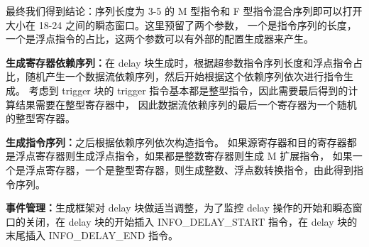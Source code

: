 \begin{table}[h!]
    \begin{center} 
    \caption{整数指令组合} 
    \label{table:int-seq}  
    \end{center}
\end{table}

最终我们得到结论：序列长度为 3-5 的 M 型指令和 F 型指令混合序列即可以打开大小在 18-24 之间的瞬态窗口。这里预留了两个参数，
一个是指令序列的长度，一个是浮点指令的占比，这两个参数可以有外部的配置生成器来产生。\par

\textbf{生成寄存器依赖序列：}在 delay 块生成时，根据超参数指令序列长度和浮点指令占比，随机产生一个数据流依赖序列，然后开始根据这个依赖序列依次进行指令生成。
考虑到 trigger 块的 trigger 指令基本都是整型指令，因此需要最后得到的计算结果需要在整型寄存器中，
因此数据流依赖序列的最后一个寄存器为一个随机的整型寄存器。\par

\textbf{生成指令序列：}之后根据依赖序列依次构造指令。
如果源寄存器和目的寄存器都是浮点寄存器则生成浮点指令，如果都是整数寄存器则生成 M 扩展指令，
如果一个是浮点寄存器，一个是整型寄存器，则生成整数、浮点数转换指令，由此得到指令序列。\par

\textbf{事件管理：}生成框架对 delay 块做适当调整，为了监控 delay 操作的开始和瞬态窗口的关闭，在 delay 块的开始插入 INFO\_DELAY\_START 指令，在
delay 块的末尾插入 INFO\_DELAY\_END 指令。\par

